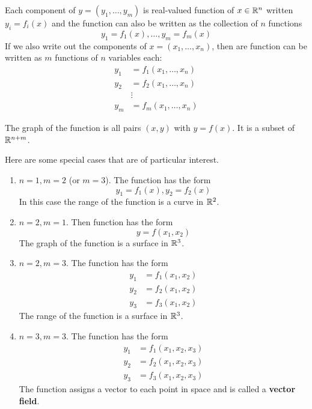 Each component of $y = (y_1, \dots, y_m)$ is real-valued function of $x \in \mathbb R^n$ written $y_i = f_i(x)$ and the function can also be written as the collection of $n$ functions
\[ y_1 = f_1(x), \dots, y_m = f_m(x) \]
If we also write out the components of $x = (x_1, \dots, x_n)$, then are function can be written as $m$ functions of $n$ variables each:
\[ \begin{split}
y_1 &= f_1(x_1, \dots, x_n) \\
y_2 &= f_2(x_1, \dots, x_n) \\
&\vdots \\
y_m &= f_m(x_1, \dots, x_n)
\end{split} \]

The graph of the function is all pairs $(x,y)$ with $y=f(x)$. It is a subset of $\mathbb R^{n+m}$.

Here are some special cases that are of particular interest.
\begin{enumerate}
\item $n = 1, m = 2$ (or $m = 3$). The function has the form
\[ y_1 = f_1(x), y_2 = f_2(x) \]
In this case the range of the function is a curve in $\mathbb R^2$.

\item $n = 2, m = 1$. Then function has the form
\[ y = f(x_1, x_2) \]
The graph of the function is a surface in $\mathbb R^3$.

\item $n = 2, m = 3$. The function has the form
\[ \begin{split}
y_1 &= f_1(x_1, x_2) \\
y_2 &= f_2(x_1, x_2) \\
y_3 &= f_3(x_1, x_2)
\end{split} \]
The range of the function is a surface in $\mathbb R^3$.

\item $n = 3, m = 3$. The function has the form
\[ \begin{split}
y_1 &= f_1(x_1, x_2, x_3) \\
y_2 &= f_2(x_1, x_2, x_3) \\
y_3 &= f_3(x_1, x_2, x_3)
\end{split} \]
The function assigns a vector to each point in space and is called a \textbf{vector field}.
\end{enumerate}

